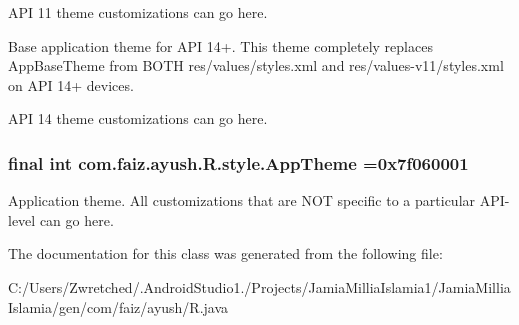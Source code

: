 A\+P\+I 11 theme customizations can go here. \begin{DoxyVerb}   Base application theme for API 14+. This theme completely replaces
   AppBaseTheme from BOTH res/values/styles.xml and
   res/values-v11/styles.xml on API 14+ devices.
\end{DoxyVerb}


A\+P\+I 14 theme customizations can go here. \hypertarget{classcom_1_1faiz_1_1ayush_1_1_r_1_1style_ae61203b5c9d9b4a831dd3219f88fae0d}{}
\subsubsection[{App\+Theme}]{\setlength{\rightskip}{0pt plus 5cm}final int com.\+faiz.\+ayush.\+R.\+style.\+App\+Theme =0x7f060001\hspace{0.3cm}{\ttfamily [static]}}\label{classcom_1_1faiz_1_1ayush_1_1_r_1_1style_ae61203b5c9d9b4a831dd3219f88fae0d}
Application theme. All customizations that are N\+O\+T specific to a particular A\+P\+I-\/level can go here. 

The documentation for this class was generated from the following file\+:\begin{DoxyCompactItemize}
\item 
C\+:/\+Users/\+Zwretched/.\+Android\+Studio1./\+Projects/\+Jamia\+Millia\+Islamia1/\+Jamia\+Millia\+Islamia/gen/com/faiz/ayush/R.\+java\end{DoxyCompactItemize}
